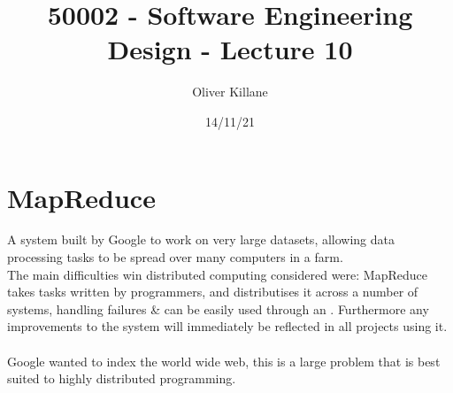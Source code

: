 \documentclass{report}
\title{50002 - Software Engineering Design - Lecture 10}
\author{Oliver Killane}
\date{14/11/21}
\begin{document}
    \maketitle

    \section*{MapReduce}
        A system built by Google to work on very large datasets, allowing data processing tasks to be spread over many computers in a farm.
        \\
        The main difficulties win distributed computing considered were:
        MapReduce takes tasks written by programmers, and distributises it across a number of systems, handling failures \& can be easily used through an . 
        Furthermore any improvements to the system will immediately be reflected in all projects using it.
        \\
        \\ Google wanted to index the world wide web, this is a large problem that is best suited to highly distributed programming.
\end{document}
